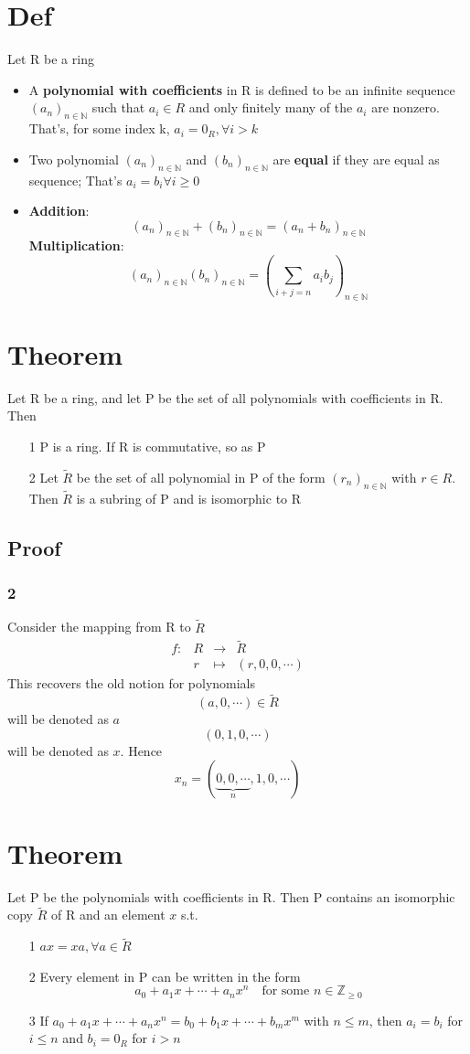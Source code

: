\documentclass{book}
\begin{document}
\section{Def}Let R be a ring
\begin{itemize}
	\item A \textbf{polynomial with coefficients} in R is defined to be an infinite sequence $(a_n)_{n\in \mathbb N}$ such that $a_i\in R$ and only finitely many of the $a_i$ are nonzero. That's, for some index k, $a_i=0_R,\forall i>k$
	\item Two polynomial $(a_n)_{n\in \mathbb N}$ and $(b_n)_{n\in \mathbb N}$ are \textbf{equal} if they are equal as sequence; That's $a_i=b_i\forall i\geq 0$
	\item \textbf{Addition}:$$(a_n)_{n\in \mathbb N}+(b_n)_{n\in \mathbb N}=(a_n+b_n)_{n\in \mathbb N}$$
	\textbf{Multiplication}:$$(a_n)_{n\in \mathbb N}(b_n)_{n\in \mathbb N}=(\sum\limits_{i+j=n}a_ib_j)_{n\in \mathbb N}$$
\end{itemize}
\section{Theorem}
Let R be a ring, and let P be the set of all polynomials with coefficients in R. Then\begin{itemize}
	\item[1] P is a ring. If R is commutative, so as P
	\item[2] Let $\tilde{R}$ be the set of all polynomial in P of the form $(r_n)_{n\in \mathbb N}$ with $r\in R$. Then $\tilde{R}$ is a subring of P and is isomorphic to R
\end{itemize}
\subsection*{Proof}
\subsubsection{2}
Consider the mapping from R to $\tilde{R}$$$\begin{aligned}
	f:&R&\rightarrow&\tilde{R}\\ &r&\mapsto&(r,0,0,\cdots)
\end{aligned}$$
This recovers the old notion for polynomials $$(a,0,\cdots)\in \tilde R$$ will be denoted as $a$$$(0,1,0,\cdots)$$ will be denoted as $x$. Hence$$x_n=(\underbrace{0,0,\cdots}\limits_{n},1,0,\cdots)$$
\section{Theorem}
Let P be the polynomials with coefficients in R. Then P contains an isomorphic copy $\tilde R$ of R and an element $x$ s.t. \begin{itemize}
	\item [1]$ax=xa,\forall a\in \tilde R$
	\item [2]Every element in P can be written in the form $$a_0+a_1x+\cdots+a_nx^n\quad\text{for some }n\in \mathbb Z_{\geq 0}$$
	\item [3]If $a_0+a_1x+\cdots+a_nx^n=b_0+b_1x+\cdots+b_mx^m$ with $n\leq m$, then $a_i=b_i$ for $i\leq n$ and $b_i=0_R$ for $i>n$
\end{itemize}
\end{document}
